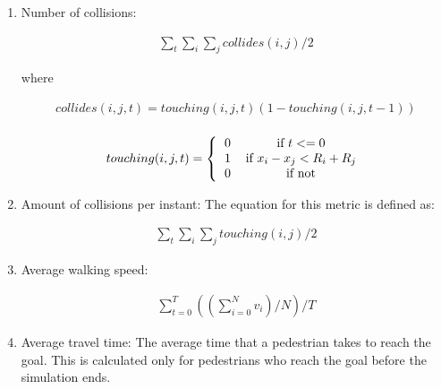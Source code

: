 \documentclass[english]{article}
\begin{document}
        \begin{enumerate}
            \item Number of collisions:

            \begin{eqnarray*}
                \sum_t\sum_i\sum_j collides(i,j)/2
            \end{eqnarray*}
            
            where
            
            \begin{eqnarray*}
            collides(i,j,t) = touching(i,j,t) (1 - touching(i,j,t-1))\\
            \end{eqnarray*}
            
            \begin{eqnarray*}
            touching(i,j,t) = 
            \left \{
                \begin{tabular}{cc}
                $0$ & if $t<=0$\\
                $1$ & if $x_i-x_j<R_i+R_j$\\
                $0$ & if not
                \end{tabular}
            \right .
            \end{eqnarray*}
            
            \item Amount of collisions per instant: The equation for this metric is
            defined as:
             
            \begin{eqnarray*}
                \sum_t\sum_i\sum_j touching(i,j)/2
            \end{eqnarray*}
            
            \item Average walking speed:
             
            \begin{eqnarray*}
                \sum_{t=0}^T((\sum_{i=0}^N v_i)/N)/T
            \end{eqnarray*}
            
            \item Average travel time: The average time that a pedestrian takes to
            reach the goal. This is calculated only for pedestrians who reach the goal
            before the simulation ends.
            

\end{enumerate}
\end{document}
